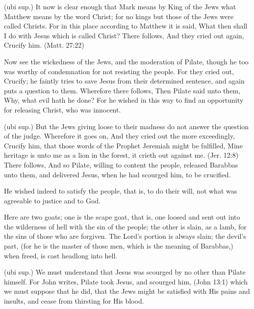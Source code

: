  (ubi sup.) It now is clear enough that Mark means by King of the Jews what Matthew means by the word Christ; for no kings but those of the Jews were called Christs. For in this place according to Matthew it is said, What then shall I do with Jesus which is called Christ? There follows, And they cried out again, Crucify him. (Matt. 27:22)

 Now see the wickedness of the Jews, and the moderation of Pilate, though he too was worthy of condemnation for not resisting the people. For they cried out, Crucify; he faintly tries to save Jesus from their determined sentence, and again puts a question to them. Wherefore there follows, Then Pilate said unto them, Why, what evil hath he done? For he wished in this way to find an opportunity for releasing Christ, who was innocent.

 (ubi sup.) But the Jews giving loose to their madness do not answer the question of the judge. Wherefore it goes on, And they cried out the more exceedingly, Crucify him, that those words of the Prophet Jeremiah might be fulfilled, Mine heritage is unto me as a lion in the forest, it crieth out against me. (Jer. 12:8) There follows, And so Pilate, willing to content the people, released Barabbas unto them, and delivered Jesus, when he had scourged him, to be crucified.

 He wished indeed to satisfy the people, that is, to do their will, not what was agreeable to justice and to God.

 Here are two goats; one is the scape goat, that is, one loosed and sent out into the wilderness of hell with the sin of the people; the other is slain, as a lamb, for the sins of those who are forgiven. The Lord’s portion is always slain; the devil’s part, (for he is the master of those men, which is the meaning of Barabbas,) when freed, is cast headlong into hell.

 (ubi sup.) We must understand that Jesus was scourged by no other than Pilate himself. For John writes, Pilate took Jesus, and scourged him, (John 13:1) which we must suppose that he did, that the Jews might be satisfied with His pains and insults, and cease from thirsting for His blood.

 

